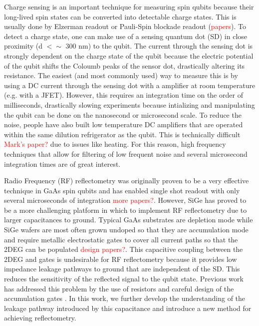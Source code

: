 \documentclass{article}
\begin{document}
	Charge sensing is an important technique for measuring spin qubits because their long-lived spin states can be converted into detectable charge states.  This is usually done by Elzerman readout or Pauli-Spin blockade readout (\textcolor{red}{papers}). To detect a charge state, one can make use of a sensing quantum dot (SD) in close proximity (d $< \sim$  300 nm) to the qubit. The current through the sensing dot is strongly dependent on the charge state of the qubit because the electric potential of the qubit shifts the Coloumb peaks of the sensor dot, drastically altering its resistance. 	The easiest (and most commonly used) way to measure this is by using a DC current through the sensing dot with a amplifier at room temperature (e.g. with a JFET). However, this requires an integration time on the order of milliseconds, drastically slowing experiments because intializing and manipulating the qubit can be done on the nanosecond or microsecond scale.  To reduce the noise, people have also built low temperature DC amplifiers that are operated within the same dilution refrigerator as the qubit.  This is technically difficult \textcolor{red}{Mark's paper?} due to issues like heating.  For this reason, high frequency techniques that allow for filtering of low frequent noise and several microsecond integration times are of great interest. 
	
	Radio Frequency (RF) reflectometry was originally proven to be a very effective technique in GaAs spin qubits and has enabled single shot readout with only several microseconds of integration \cite{Schoelkopf1998} \textcolor{red}{more papers?}. However, SiGe has proved to be a more challenging platform in which to implement RF reflectometry due to larger capacitances to ground. Typical GaAs substrates are depletion mode while SiGe wafers are most often grown undoped so that they are accumulation mode and require metallic electrostatic gates to cover all current paths so that the 2DEG can be populated \textcolor{red}{design papers?}. This capacitive coupling between the 2DEG and gates is undesirable for RF reflectometry because it provides low impedance leakage pathways to ground that are independent of the SD. This reduces the sensitivity of the reflected signal to the qubit state. Previous work has addressed this problem by the use of resistors \cite{Volk2019} and careful design of the accumulation gates \cite{Connors2020}.  In this work, we further develop the understanding of the leakage pathway introduced by this capacitance and introduce a new method for achieving reflectometry.
	
\end{document}
